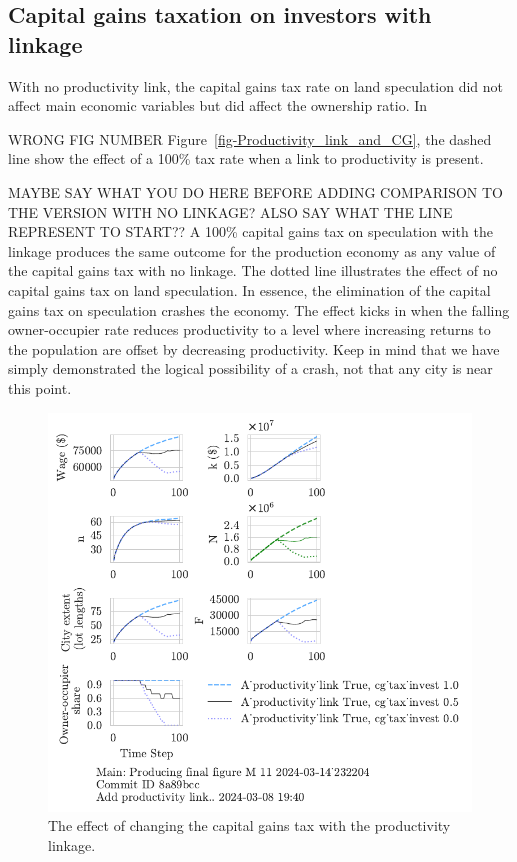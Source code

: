 \subsection{Capital gains taxation on investors with linkage}\label{subsec:CGinvest}
With no productivity link, the capital gains tax rate on land speculation did not affect main economic variables but did affect the ownership ratio. In {{\color{red} WRONG FIG NUMBER}  Figure~\ref{fig-Productivity_link_and_CG}, the dashed line show the effect of a 100\%  tax rate when a link to productivity is present. 

{\color{red} MAYBE SAY WHAT YOU DO HERE BEFORE ADDING COMPARISON TO THE VERSION WITH NO LINKAGE? ALSO SAY WHAT THE LINE REPRESENT TO START?? A 100\% capital gains tax on speculation with the linkage produces the same outcome for the production economy as any value of the capital gains tax with no linkage. The dotted line illustrates the effect of no capital gains tax on land speculation. In essence, the elimination of the capital gains tax on speculation crashes the economy. The effect kicks in when the falling owner-occupier rate reduces productivity to a level where increasing returns to the population are offset by decreasing productivity. Keep in mind that we have simply demonstrated the logical possibility of a crash, not that any city is near this point. }

\begin{figure}[h!tb]\label{fig-Productivity_link_and_CG}
    \centering
     \includegraphics[scale=1, trim=.25cm 2cm .25cm .25cm, clip]{fig/With-productivity_linkcg_tax_invest-232204.pdf}
    \caption[The effect of changing the capital gains tax with the productivity linkage]{The effect of changing the capital gains tax with the productivity linkage.}
    \label{fig:Productivity_link_and_CG}
\end{figure}

}
